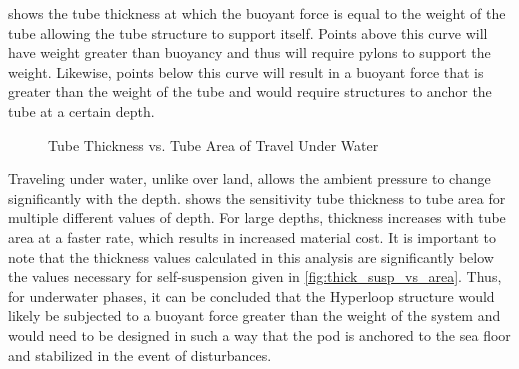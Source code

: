  shows the tube thickness at which the buoyant force is equal to the weight of the tube allowing the tube structure to support itself. Points above this curve will have weight greater than buoyancy and thus will require pylons to support the weight. Likewise, points below this curve will result in a buoyant force that is greater than the weight of the tube and would require structures to anchor the tube at a certain depth. 

\begin{figure}
	\centering
	\caption{Tube Thickness vs. Tube Area of Travel Under Water}
	\label{fig:tube_thick_vs_tube_area_underwater}
\end{figure}

Traveling under water, unlike over land, allows the ambient pressure to change significantly with the depth.  shows the sensitivity tube thickness to tube area for multiple different values of depth. For large depths, thickness increases with tube area at a faster rate, which results in increased material cost. It is important to note that the thickness values calculated in this analysis are significantly below the values necessary for self-suspension given in \cref{fig:thick_susp_vs_area}. Thus, for underwater phases, it can be concluded that the Hyperloop structure would likely be subjected to a buoyant force greater than the weight of the system and would need to be designed in such a way that the pod is anchored to the sea floor and stabilized in the event of disturbances. 
